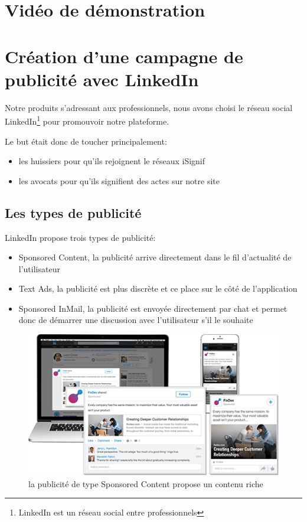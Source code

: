 \documentclass[]{report}
\begin{document}
  \section{Vidéo de démonstration}

  \section{Création d'une campagne de publicité avec LinkedIn}

    Notre produits s’adressant aux professionnels, nous avons choisi le réseau social LinkedIn\footnote{LinkedIn est un réseau social entre professionnels} pour promouvoir notre plateforme.

    Le but était donc de toucher principalement:

    \begin{itemize}
        \item les huissiers pour qu'ils rejoignent le réseaux iSignif
        \item les avocats pour qu'ils signifient des actes sur notre site
    \end{itemize}

    \subsection{Les types de publicité}

      LinkedIn propose trois types de publicité:

      \begin{itemize}
        \item Sponsored Content, la publicité arrive directement dans le fil d'actualité de l'utilisateur
        \item Text Ads, la publicité est plus discrète et ce place sur le côté de l'application
        \item Sponsored InMail, la publicité est envoyée directement par chat et permet donc de démarrer une discussion avec l'utilisateur s'il le souhaite
      \end{itemize}

      \begin{figure}
        \includegraphics[width=\linewidth]{img/linkedin_sponsored_content.png}
        \caption{la publicité de type Sponsored Content propose un contenu riche}
        \label{linkedin_sponsored_content}
      \end{figure}
\end{document}
